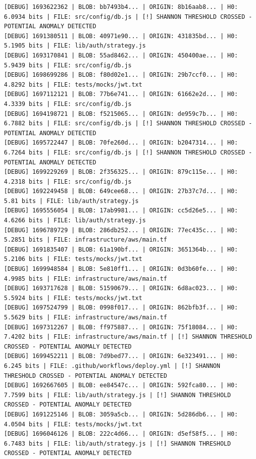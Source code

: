 \documentclass[12pt, a4paper, oneside]{report}
\begin{document}
\newpage
\begin{lstlisting}[basicstyle=\tiny\ttfamily]
[DEBUG] 1693622362 | BLOB: bb7493b4... | ORIGIN: 8b16aab8... | H0: 6.0934 bits | FILE: src/config/db.js | [!] SHANNON THRESHOLD CROSSED - POTENTIAL ANOMALY DETECTED
[DEBUG] 1691380511 | BLOB: 40971e90... | ORIGIN: 431835bd... | H0: 5.1905 bits | FILE: lib/auth/strategy.js
[DEBUG] 1693170841 | BLOB: 55ad8462... | ORIGIN: 450400ae... | H0: 5.9439 bits | FILE: src/config/db.js
[DEBUG] 1698699286 | BLOB: f80d02e1... | ORIGIN: 29b7ccf0... | H0: 4.8292 bits | FILE: tests/mocks/jwt.txt
[DEBUG] 1697112121 | BLOB: 77b6e741... | ORIGIN: 61662e2d... | H0: 4.3339 bits | FILE: src/config/db.js
[DEBUG] 1694198721 | BLOB: f5215065... | ORIGIN: de959c7b... | H0: 6.7882 bits | FILE: src/config/db.js | [!] SHANNON THRESHOLD CROSSED - POTENTIAL ANOMALY DETECTED
[DEBUG] 1695722447 | BLOB: 70fe260d... | ORIGIN: b2047314... | H0: 6.7264 bits | FILE: src/config/db.js | [!] SHANNON THRESHOLD CROSSED - POTENTIAL ANOMALY DETECTED
[DEBUG] 1699229269 | BLOB: 2f356325... | ORIGIN: 879c115e... | H0: 4.2318 bits | FILE: src/config/db.js
[DEBUG] 1692249458 | BLOB: 649cee68... | ORIGIN: 27b37c7d... | H0: 5.81 bits | FILE: lib/auth/strategy.js
[DEBUG] 1695556054 | BLOB: 17ab9981... | ORIGIN: cc5d26e5... | H0: 4.6266 bits | FILE: lib/auth/strategy.js
[DEBUG] 1696789729 | BLOB: 286db252... | ORIGIN: 77ec435c... | H0: 5.2851 bits | FILE: infrastructure/aws/main.tf
[DEBUG] 1691835407 | BLOB: 61a190bf... | ORIGIN: 3651364b... | H0: 5.2106 bits | FILE: tests/mocks/jwt.txt
[DEBUG] 1699948584 | BLOB: 5e810ff1... | ORIGIN: 0d3b60fe... | H0: 4.9985 bits | FILE: infrastructure/aws/main.tf
[DEBUG] 1693717628 | BLOB: 51590679... | ORIGIN: 6d8ac023... | H0: 5.5924 bits | FILE: tests/mocks/jwt.txt
[DEBUG] 1697524799 | BLOB: 0998f017... | ORIGIN: 862bfb3f... | H0: 5.5629 bits | FILE: infrastructure/aws/main.tf
[DEBUG] 1697312267 | BLOB: ff975887... | ORIGIN: 75f18084... | H0: 7.4202 bits | FILE: infrastructure/aws/main.tf | [!] SHANNON THRESHOLD CROSSED - POTENTIAL ANOMALY DETECTED
[DEBUG] 1699452211 | BLOB: 7d9bed77... | ORIGIN: 6e323491... | H0: 6.245 bits | FILE: .github/workflows/deploy.yml | [!] SHANNON THRESHOLD CROSSED - POTENTIAL ANOMALY DETECTED
[DEBUG] 1692667605 | BLOB: ee84547c... | ORIGIN: 592fca80... | H0: 7.7599 bits | FILE: lib/auth/strategy.js | [!] SHANNON THRESHOLD CROSSED - POTENTIAL ANOMALY DETECTED
[DEBUG] 1691225146 | BLOB: 3059a5cb... | ORIGIN: 5d286db6... | H0: 4.0504 bits | FILE: tests/mocks/jwt.txt
[DEBUG] 1696046126 | BLOB: 222c4d66... | ORIGIN: d5ef58f5... | H0: 6.7483 bits | FILE: lib/auth/strategy.js | [!] SHANNON THRESHOLD CROSSED - POTENTIAL ANOMALY DETECTED

\end{lstlisting}
\end{document}
